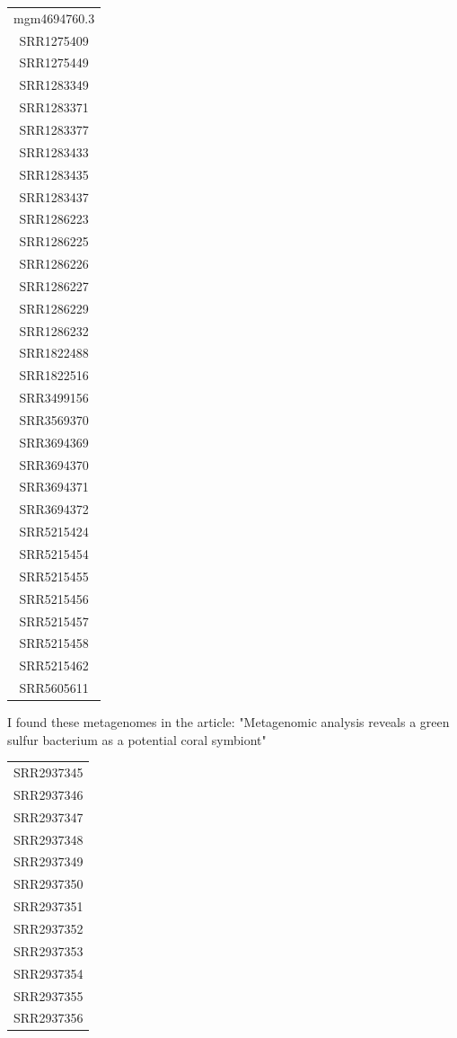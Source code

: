 \documentclass[12pt, a4paper]{report}
\begin{document}
\begin{center}
\begin{longtable}{c}
mgm4694760.3\\
SRR1275409\\
SRR1275449\\
SRR1283349\\
SRR1283371\\
SRR1283377\\
SRR1283433\\
SRR1283435\\
SRR1283437\\
SRR1286223\\
SRR1286225\\
SRR1286226\\
SRR1286227\\
SRR1286229\\
SRR1286232\\
SRR1822488\\
SRR1822516\\
SRR3499156\\
SRR3569370\\
SRR3694369\\
SRR3694370\\
SRR3694371\\
SRR3694372\\
SRR5215424\\
SRR5215454\\
SRR5215455\\
SRR5215456\\
SRR5215457\\
SRR5215458\\
SRR5215462\\
SRR5605611\\
 \end{longtable}
\end{center}


I found these metagenomes in the article: "Metagenomic analysis reveals a green sulfur bacterium as a potential coral symbiont"

\begin{center}
\begin{longtable}{c}
SRR2937345\\
SRR2937346\\
SRR2937347\\
SRR2937348\\
SRR2937349\\
SRR2937350\\
SRR2937351\\
SRR2937352\\
SRR2937353\\
SRR2937354\\
SRR2937355\\
SRR2937356\\
 \end{longtable}
\end{center}
\end{document}
